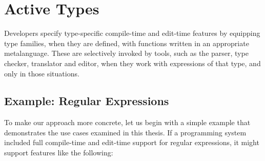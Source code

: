


\section{Active Types}
Developers specify type-specific compile-time and edit-time features by equipping type families, when they are defined, with functions written in an appropriate metalanguage. These are selectively invoked by tools, such as the parser, type checker, translator and editor, when they work with expressions of that type, and only in those situations.

\subsection{Example: Regular Expressions}
To make our approach more concrete, let us begin with a simple example that demonstrates the use cases examined in this thesis. If a programming system included full compile-time and edit-time support for regular expressions, it might support features like the following:

